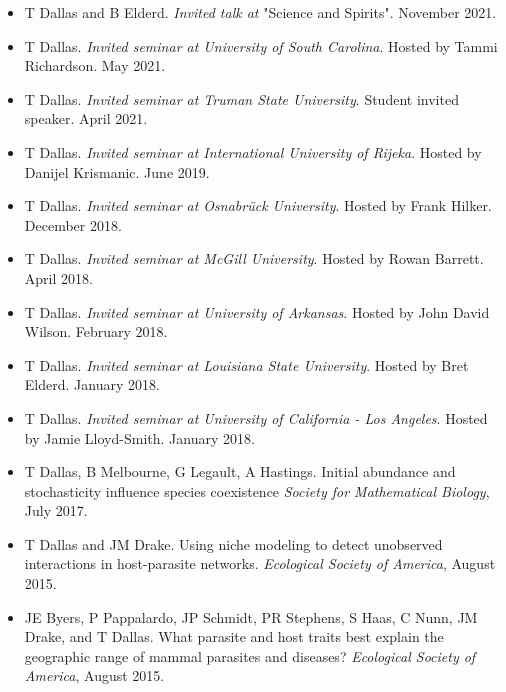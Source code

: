 \documentclass[]{CV}
\begin{document}
\begin{itemize}

\item {\mefont T Dallas} and B Elderd. \textit{Invited talk at} "Science and Spirits". November 2021.

\item {\mefont T Dallas}. \textit{Invited seminar at University of South Carolina}. Hosted by Tammi Richardson. May 2021. 

\item {\mefont T Dallas}. \textit{Invited seminar at Truman State University}. Student invited speaker. April 2021. 

\item {\mefont T Dallas}. \textit{Invited seminar at International University of Rijeka}. Hosted by Danijel Krismanic. June 2019.

\item {\mefont T Dallas}. \textit{Invited seminar at Osnabr\"uck University}. Hosted by Frank Hilker. December 2018.

\item {\mefont T Dallas}. \textit{Invited seminar at McGill University}. Hosted by Rowan Barrett. April 2018. 

\item {\mefont T Dallas}. \textit{Invited seminar at University of Arkansas}. Hosted by John David Wilson. February 2018. 

\item {\mefont T Dallas}. \textit{Invited seminar at Louisiana State University}. Hosted by Bret Elderd. January 2018. 

\item {\mefont T Dallas}. \textit{Invited seminar at University of California - Los Angeles}. Hosted by Jamie Lloyd-Smith. January 2018. 

\item {\mefont T Dallas}, B Melbourne, G Legault, A Hastings. Initial abundance and stochasticity influence species coexistence \textit{Society for Mathematical Biology}, July 2017.

\item {\mefont T Dallas} and JM Drake. Using niche modeling to detect unobserved interactions in host-parasite networks. \textit{Ecological Society of America}, August 2015.

\item JE Byers, P Pappalardo, JP Schmidt, PR Stephens, S Haas, C Nunn, JM Drake, and {\mefont T Dallas}. What parasite and host traits best explain the geographic range of mammal parasites and diseases? \textit{Ecological Society of America}, August  2015.


\end{itemize}
\end{document}
